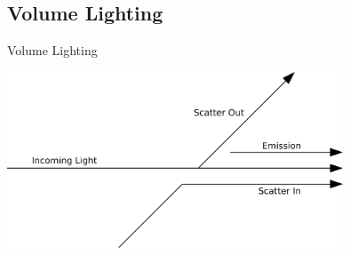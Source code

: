 \documentclass[10pt,compress,professionalfont]{beamer}
\begin{document}
\subsection{Volume Lighting}
\begin{frame}{Volume Lighting}

    \centering
    \vspace{0cm}
    \includegraphics[width=100mm]{../img/diag/vol_scatter.pdf}

\end{frame}
\end{document}
